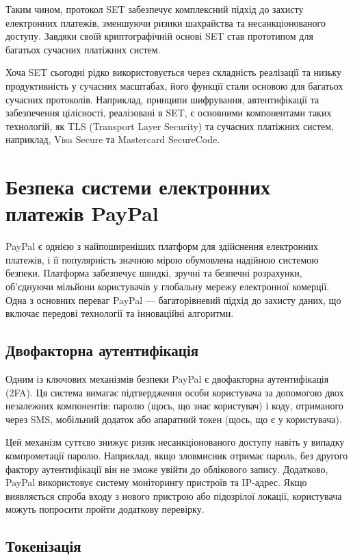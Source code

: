 Таким чином, протокол SET забезпечує комплексний підхід до захисту електронних платежів, зменшуючи ризики шахрайства та несанкціонованого доступу. Завдяки своїй криптографічній основі SET став прототипом для багатьох сучасних платіжних систем.

Хоча SET сьогодні рідко використовується через складність реалізації та низьку продуктивність у сучасних масштабах, його функції стали основою для багатьох сучасних протоколів. Наприклад, принципи шифрування, автентифікації та забезпечення цілісності, реалізовані в SET, є основними компонентами таких технологій, як TLS (Transport Layer Security) та сучасних платіжних систем, наприклад, Visa Secure та Mastercard SecureCode.

\section{Безпека системи електронних платежів PayPal}

PayPal є однією з найпоширеніших платформ для здійснення електронних платежів, і її популярність значною мірою обумовлена надійною системою безпеки. Платформа забезпечує швидкі, зручні та безпечні розрахунки, об'єднуючи мільйони користувачів у глобальну мережу електронної комерції. Одна з основних переваг PayPal — багаторівневий підхід до захисту даних, що включає передові технології та інноваційні алгоритми.

\subsection{Двофакторна аутентифікація}

Одним із ключових механізмів безпеки PayPal є двофакторна аутентифікація (2FA). Ця система вимагає підтвердження особи користувача за допомогою двох незалежних компонентів: паролю (щось, що знає користувач) і коду, отриманого через SMS, мобільний додаток або апаратний токен (щось, що є у користувача). 

Цей механізм суттєво знижує ризик несанкціонованого доступу навіть у випадку компрометації паролю. Наприклад, якщо зловмисник отримає пароль, без другого фактору аутентифікації він не зможе увійти до облікового запису. Додатково, PayPal використовує систему моніторингу пристроїв та IP-адрес. Якщо виявляється спроба входу з нового пристрою або підозрілої локації, користувача можуть попросити пройти додаткову перевірку.

\subsection{Токенізація}

